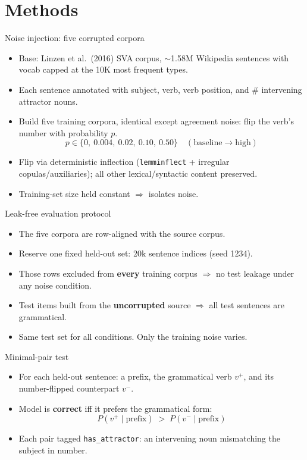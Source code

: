 \section{Methods}


\begin{frame}{Noise injection: five corrupted corpora}
  \begin{itemize}
    \item Base: Linzen et al.\ (2016) SVA corpus, $\sim$1.58M Wikipedia
          sentences with vocab capped at the 10K most frequent types.
    \item Each sentence annotated with subject, verb, verb position, and
          \# intervening attractor nouns.
    \item Build five training corpora, identical except agreement noise:
          flip the verb's number with probability $p$.
          \[
            p \in \{0,\ 0.004,\ 0.02,\ 0.10,\ 0.50\}
            \quad(\text{baseline} \to \text{high})
          \]
    \item Flip via deterministic inflection (\texttt{lemminflect} + irregular
          copulas/auxiliaries); all other lexical/syntactic content preserved.
    \item Training-set size held constant $\Rightarrow$ isolates noise.
  \end{itemize}
\end{frame}

\begin{frame}{Leak-free evaluation protocol}
  \begin{itemize}
    \item The five corpora are row-aligned with the source corpus.
    \item Reserve one fixed held-out set: 20k sentence indices (seed 1234).
    \item Those rows excluded from \textbf{every} training corpus
          $\Rightarrow$ no test leakage under any noise condition.
    \item Test items built from the \textbf{uncorrupted} source
          $\Rightarrow$ all test sentences are grammatical.
    \item Same test set for all conditions. Only the training noise varies.
  \end{itemize}
\end{frame}

\begin{frame}{Minimal-pair test}
  \begin{itemize}
    \item For each held-out sentence: a prefix, the grammatical verb $v^{+}$,
          and its number-flipped counterpart $v^{-}$.
    \item Model is \textbf{correct} iff it prefers the grammatical form:
          \[
            P(v^{+}\mid \text{prefix}) \; > \; P(v^{-}\mid \text{prefix})
          \]
    \item Each pair tagged \texttt{has\_attractor}: an intervening noun
          mismatching the subject in number.
  \end{itemize}
\end{frame}

